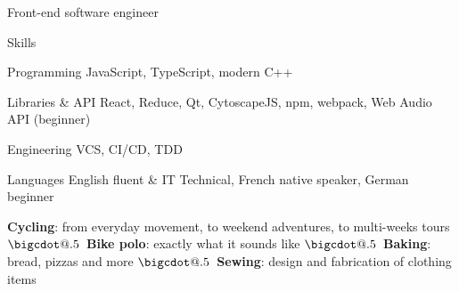\documentclass{article}
\makeatletter
\newcommand*\bigcdot{$\mathpalette\bigcdot@{.5}$~}
\newcommand*\bigcdot@[2]{\mathbin{\vcenter{\hbox{\scalebox{#2}{$\m@th#1\bullet$}}}}}
\newcommand{\cvitem}[1]{
\raggedright{
\vskip 3mm
\makebox[\textwidth]{\rule{11mm}{0.4pt} \hskip 2mm {\Large\bf\sc #1} \hskip 2mm \leaders \hrule \hfill}
}
}
\makeatother
\begin{document}
\begin{cv}{Front-end software engineer}
\begin{cvlist}{Skills}
    \item[Programming] JavaScript, TypeScript, modern C++
    \item[Libraries \& API] React, Reduce, Qt, CytoscapeJS, npm, webpack, Web Audio API (beginner)
    \item[Engineering] VCS, CI/CD, TDD
    \item[Languages] English fluent \& IT Technical, French native speaker, German beginner
\end{cvlist}


\cvitem{Interests}
\vskip -1.5mm
  \textbf{Cycling}: from everyday movement, to weekend adventures, to multi-weeks tours
  \bigcdot \textbf{Bike polo}: exactly what it sounds like
  \bigcdot \textbf{Baking}: bread, pizzas and more
  \bigcdot \textbf{Sewing}: design and fabrication of clothing items

\end{cv}
\vfill
\end{document}

